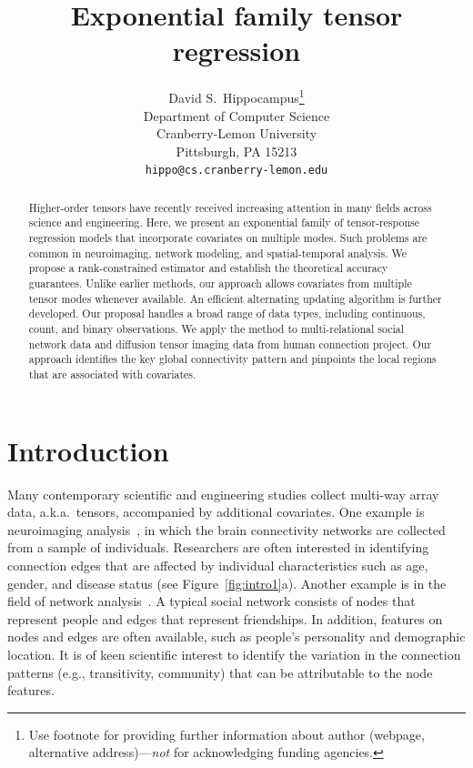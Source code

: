 \documentclass{article}
\title{Exponential family tensor regression}
\author{%
  David S.~Hippocampus\thanks{Use footnote for providing further information
    about author (webpage, alternative address)---\emph{not} for acknowledging
    funding agencies.} \\
  Department of Computer Science\\
  Cranberry-Lemon University\\
  Pittsburgh, PA 15213 \\
  \texttt{hippo@cs.cranberry-lemon.edu} \\

}
\theoremstyle{plain}
\theoremstyle{definition}
\begin{document}
\maketitle

\begin{abstract}
  Higher-order tensors have recently received increasing attention in many fields across science and engineering. Here, we present an exponential family of tensor-response regression models that incorporate covariates on multiple modes. Such problems are common in neuroimaging, network modeling, and spatial-temporal analysis. We propose a rank-constrained estimator and establish the theoretical accuracy guarantees. Unlike earlier methods, our approach allows covariates from multiple tensor modes whenever available. An efficient alternating updating algorithm is further developed. Our proposal handles a broad range of data types, including continuous, count, and binary observations. We apply the method to multi-relational social network data and diffusion tensor imaging data from human connection project. Our approach identifies the key global connectivity pattern and pinpoints the local regions that are associated with covariates.
\end{abstract}

\section{Introduction}

Many contemporary scientific and engineering studies collect multi-way array data, a.k.a.\ tensors, accompanied by additional covariates. One example is neuroimaging analysis~\cite{sun2017store,zhou2013tensor}, in which the brain connectivity networks are collected from a sample of individuals. Researchers are often interested in identifying connection edges that are affected by individual characteristics such as age, gender, and disease status (see Figure~\ref{fig:intro1}a). Another example is in the field of network analysis~\cite{baldin2018optimal,hoff2005bilinear}. A typical social network consists of nodes that represent people and edges that represent friendships. In addition, features on nodes and edges are often available, such as people's personality and demographic location. It is of keen scientific interest to identify the variation in the connection patterns (e.g., transitivity, community) that can be attributable to the node features.  
\end{document}
